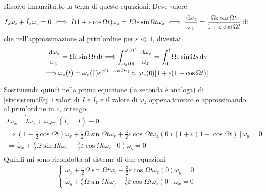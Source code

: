 \documentclass[../main.tex]{subfiles}
\begin{document}
Risolvo innanzitutto la terza di queste equazioni. Deve valere:
\begin{equation*}
	I_z\dot\omega_z+\dot I_z\omega_z=0 \iff I(1+\varepsilon \cos\Omega t)\dot\omega_z=I\Omega\varepsilon\sin\Omega t \omega_z \iff 
	\frac{\,\mathrm{d} \omega_z}{\omega_z}=\frac{\Omega\varepsilon\sin\Omega t}{1+\varepsilon \cos\Omega t}\,\mathrm{d} t
\end{equation*}
che nell'approssimazione al prim'ordine per $\varepsilon \ll 1$, diventa:
\begin{gather*}
	\frac{\,\mathrm{d} \omega_z}{\omega_z}=\Omega\varepsilon\sin\Omega t\,\mathrm{d} t \Longrightarrow 
	\int_{\omega_z(0)}^{\omega_z(t)}\frac{\,\mathrm{d} \omega_z}{\omega_z}=\int_0^t \Omega\varepsilon\sin\Omega s\,\mathrm{d} s\\
	\Longrightarrow \omega_z(t)=\omega_z(0)e^{\varepsilon(1-\cos\Omega t)}\simeq \omega_z(0)[1+\varepsilon(1-\cos\Omega t)]
\end{gather*}

Sostituendo quindi nella prima equazione (la seconda è analoga) di \cref{stv:sistemaEq} i valori di $\bar I$ e $I_z$ e il valore di $\omega_z$ appena trovato e approssimando al prim'ordine in $\varepsilon$, ottengo:
\begin{gather*}
	\bar I\dot\omega_x+\dot {\bar I}\omega_x+\omega_y\omega_z(I_z-\bar I)=0 \\
	\Longrightarrow (1-\frac \varepsilon 2\cos\Omega t) \dot\omega_x+\frac{\varepsilon}2 \Omega \sin\Omega t \omega_x + \frac 32 \varepsilon\cos\Omega t \omega_z(0)[1+\varepsilon(1-\cos\Omega t)] \omega_y=0\\
	\Longrightarrow \dot\omega_x+\frac{\varepsilon}2 \Omega \sin\Omega t \omega_x + \frac 32 \varepsilon\cos\Omega t \omega_z(0)\omega_y=0\\
\end{gather*}
Quindi mi sono ricondotta al sistema di due equazioni
\begin{equation*}
	\begin{cases}
		\dot\omega_x+\frac{\varepsilon}2 \Omega \sin\Omega t \omega_x + \frac 32 \varepsilon\cos\Omega t \omega_z(0)\omega_y=0\\
		\dot\omega_y+\frac{\varepsilon}2 \Omega \sin\Omega t \omega_y - \frac 32 \varepsilon\cos\Omega t \omega_z(0)\omega_x=0
	\end{cases}
\end{equation*}
\end{document}
